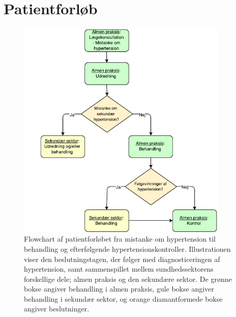\chapter{Patientforløb}

\begin{figure}[H]
\centering
\includegraphics[width=0.9\textwidth]{figures/patientforloeb3}
\caption{Flowchart af patientforløbet fra mistanke om hypertension til behandling og efterfølgende hypertensionskontroller. Illustrationen viser den beslutningstagen, der følger med diagnosticeringen af hypertension, samt sammenspillet mellem sundhedssektorens forskellige dele; almen praksis og den sekundære sektor. De grønne bokse angiver behandling i almen praksis, gule bokse angiver behandling i sekundær sektor, og orange diamantformede bokse angiver beslutninger.}
\label{fig:patientforloeb}
\end{figure}